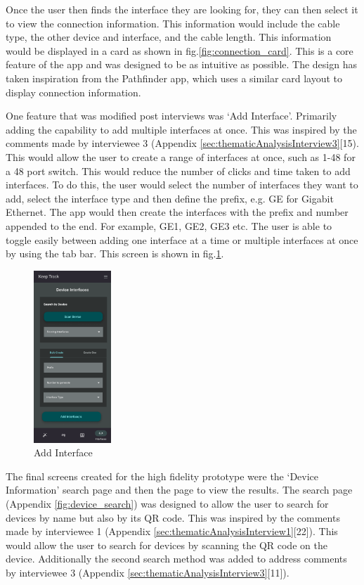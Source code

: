 \documentclass [11pt,a4paper]{article}
\begin{document}
Once the user then finds the interface they are looking for, they can then select it to view the connection information. This information would include the cable type, the other device and interface, and the cable length. This information would be displayed in a card as shown in fig.\ref{fig:connection_card}. This is a core feature of the app and was designed to be as intuitive as possible. The design has taken inspiration from the Pathfinder app, which uses a similar card layout to display connection information.

One feature that was modified post interviews was `Add Interface'. Primarily adding the capability to add multiple interfaces at once. This was inspired by the comments made by interviewee 3 (Appendix \ref{sec:thematicAnalysisInterview3}[15). This would allow the user to create a range of interfaces at once, such as 1-48 for a 48 port switch. This would reduce the number of clicks and time taken to add interfaces. To do this, the user would select the number of interfaces they want to add, select the interface type and then define the prefix, e.g. GE for Gigabit Ethernet. The app would then create the interfaces with the prefix and number appended to the end. For example, GE1, GE2, GE3 etc. The user is able to toggle easily between adding one interface at a time or multiple interfaces at once by using the tab bar. This screen is shown in fig.\ref{fig:interface_add}.

\begin{figure}
    \centering
    \includegraphics[width=0.26\textwidth]{images/interface_add.png}
    \caption{Add Interface}
    \label{fig:interface_add}
\end{figure}

The final screens created for the high fidelity prototype were the `Device Information' search page and then the page to view the results. The search page (Appendix \ref{fig:device_search}) was designed to allow the user to search for devices by name but also by its QR code. This was inspired by the comments made by interviewee 1 (Appendix \ref{sec:thematicAnalysisInterview1}[22]). This would allow the user to search for devices by scanning the QR code on the device. Additionally the second search method was added to address comments by interviewee 3 (Appendix \ref{sec:thematicAnalysisInterview3}[11]). 
\end{document}

